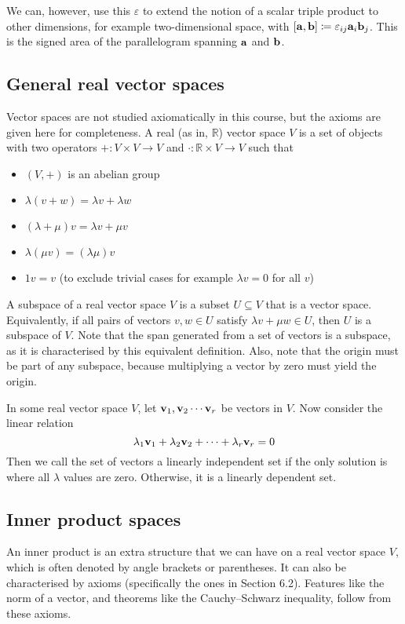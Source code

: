 We can, however, use this \(\varepsilon\) to extend the notion of a scalar triple product to other dimensions, for example two-dimensional space, with \([\vb a, \vb b] \coloneq \varepsilon_{ij} \vb a_i \vb b_j\).
This is the signed area of the parallelogram spanning \(\vb a\) and \(\vb b\).

\subsection{General real vector spaces}
Vector spaces are not studied axiomatically in this course, but the axioms are given here for completeness.
A real (as in, \(\mathbb R\)) vector space \(V\) is a set of objects with two operators \(+: V \times V \to V\) and \(\cdot: \mathbb R \times V \to V\) such that
\begin{itemize}
	\item \((V, +)\) is an abelian group
	\item \(\lambda(v + w) = \lambda v + \lambda w\)
	\item \((\lambda + \mu)v = \lambda v + \mu v\)
	\item \(\lambda(\mu v) = (\lambda \mu) v\)
	\item \(1v = v\) (to exclude trivial cases for example \(\lambda v = 0\) for all \(v\))
\end{itemize}

A subspace of a real vector space \(V\) is a subset \(U \subseteq V\) that is a vector space.
Equivalently, if all pairs of vectors \(v, w \in U\) satisfy \(\lambda v + \mu w \in U\), then \(U\) is a subspace of \(V\).
Note that the span generated from a set of vectors is a subspace, as it is characterised by this equivalent definition.
Also, note that the origin must be part of any subspace, because multiplying a vector by zero must yield the origin.

In some real vector space \(V\), let \(\vb v_1, \vb v_2 \cdots \vb v_r\) be vectors in \(V\).
Now consider the linear relation
\[
	\lambda_1 \vb v_1 + \lambda_2 \vb v_2 + \cdots + \lambda_r \vb v_r = 0
\]
Then we call the set of vectors a linearly independent set if the only solution is where all \(\lambda\) values are zero.
Otherwise, it is a linearly dependent set.

\subsection{Inner product spaces}
An inner product is an extra structure that we can have on a real vector space \(V\), which is often denoted by angle brackets or parentheses.
It can also be characterised by axioms (specifically the ones in Section 6.2).
Features like the norm of a vector, and theorems like the Cauchy--Schwarz inequality, follow from these axioms.

